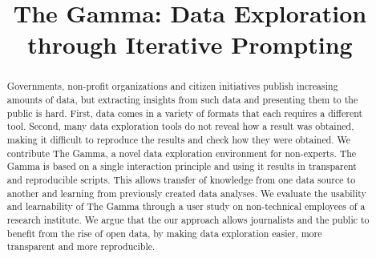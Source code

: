 \documentclass{sigchi}
\def\plaintitle{The Gamma: Data Exploration through Iterative Prompting}
\begin{document}
\title{\plaintitle}

\author{%
}

\maketitle

\begin{abstract}
Governments, non-profit organizations and citizen initiatives publish increasing amounts of
data, but extracting insights from such data and presenting them to the public is hard.
First, data comes in a variety of formats that each requires a different tool. Second, many
data exploration tools do not reveal how a result was obtained, making it difficult to reproduce
the results and check how they were obtained.
%
We contribute The Gamma, a novel data exploration environment for non-experts. The Gamma is based
on a single interaction principle and using it results in transparent and reproducible scripts.
This allows transfer of knowledge from one data source to another and
learning from previously created data analyses. We evaluate the usability and learnability of
The Gamma through a user study on non-technical employees of a research institute.
%
We argue that the our approach allows journalists and the public to benefit from the rise
of open data, by making data exploration easier, more transparent and more reproducible.
\end{abstract}


%
%
\end{document}
